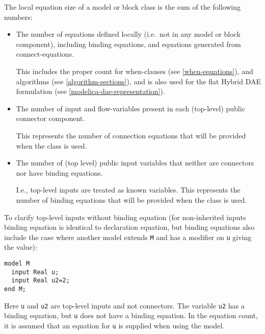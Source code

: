 \begin{definition}
The local equation size of a model or block class is the sum of the following numbers:
\begin{itemize}
\item
  The number of equations defined locally (i.e.\ not in any model or
  block component), including binding equations, and equations generated
  from connect-equations.
  \begin{nonnormative}
  This includes the proper count for when-clauses (see \cref{when-equations}), and algorithms (see \cref{algorithm-sections}), and is also used for
  the flat Hybrid DAE formulation (see \cref{modelica-dae-representation}).
  \end{nonnormative}
\item
  The number of input and flow-variables present in each (top-level) public connector component.
  \begin{nonnormative}
  This represents the number of connection equations that will be provided when the class is used.
  \end{nonnormative}
\item
  The number of (top level) public input variables that neither are connectors nor have binding equations.
  \begin{nonnormative}
  I.e., top-level inputs are treated as known variables.  This represents the number of binding equations that will be provided when the class is used.
  \end{nonnormative}
\end{itemize}
\end{definition}

\begin{nonnormative}
To clarify top-level inputs without binding equation (for
non-inherited inputs binding equation is identical to declaration
equation, but binding equations also include the case where another
model extends \lstinline!M! and has a modifier on \lstinline!u! giving the value):
\begin{lstlisting}[language=modelica]
model M
  input Real u;
  input Real u2=2;
end M;
\end{lstlisting}

Here \lstinline!u! and \lstinline!u2! are top-level inputs and not connectors. The
variable \lstinline!u2! has a binding equation, but \lstinline!u! does not have a binding
equation. In the equation count, it is assumed that an equation for \lstinline!u! is
supplied when using the model.
\end{nonnormative}


